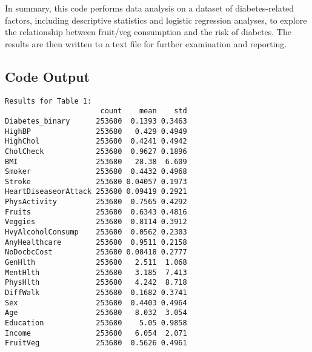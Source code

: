 \documentclass[11pt]{article}
\begin{document}
In summary, this code performs data analysis on a dataset of diabetes-related factors, including descriptive statistics and logistic regression analyses, to explore the relationship between fruit/veg consumption and the risk of diabetes. The results are then written to a text file for further examination and reporting.

\subsection*{Code Output}

\begin{footnotesize}
\begin{Verbatim}[tabsize=4]
Results for Table 1:
                      count    mean    std
Diabetes_binary      253680  0.1393 0.3463
HighBP               253680   0.429 0.4949
HighChol             253680  0.4241 0.4942
CholCheck            253680  0.9627 0.1896
BMI                  253680   28.38  6.609
Smoker               253680  0.4432 0.4968
Stroke               253680 0.04057 0.1973
HeartDiseaseorAttack 253680 0.09419 0.2921
PhysActivity         253680  0.7565 0.4292
Fruits               253680  0.6343 0.4816
Veggies              253680  0.8114 0.3912
HvyAlcoholConsump    253680  0.0562 0.2303
AnyHealthcare        253680  0.9511 0.2158
NoDocbcCost          253680 0.08418 0.2777
GenHlth              253680   2.511  1.068
MentHlth             253680   3.185  7.413
PhysHlth             253680   4.242  8.718
DiffWalk             253680  0.1682 0.3741
Sex                  253680  0.4403 0.4964
Age                  253680   8.032  3.054
Education            253680    5.05 0.9858
Income               253680   6.054  2.071
FruitVeg             253680  0.5626 0.4961


\end{Verbatim}
\end{footnotesize}
\end{document}
